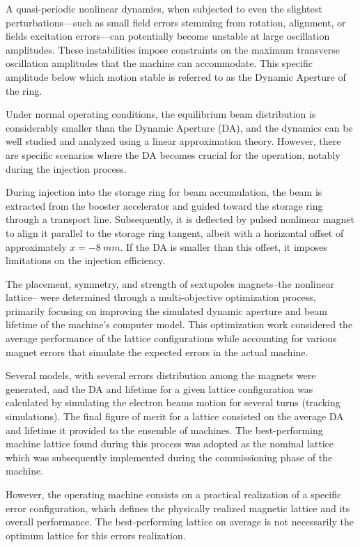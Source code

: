 A quasi-periodic nonlinear dynamics, when subjected to even the slightest perturbations—such as small field errors stemming from rotation, alignment, or fields excitation errors—can potentially become unstable at large oscillation amplitudes. These instabilities impose constraints on the maximum transverse oscillation amplitudes that the machine can accommodate. This specific amplitude below which motion stable is referred to as the Dynamic Aperture of the ring.

Under normal operating conditions, the equilibrium beam distribution is considerably smaller than the Dynamic Aperture (DA), and the dynamics can be well studied and analyzed using a linear approximation theory. However, there are specific scenarios where the DA becomes crucial for the operation, notably during the injection process.

During injection into the storage ring for beam accumulation, the beam is extracted from the booster accelerator and guided toward the storage ring through a transport line. Subsequently, it is deflected by pulsed nonlinear magnet to align it parallel to the storage ring tangent, albeit with a horizontal offset of approximately $x=-8~\unit{mm}$. If the DA is smaller than this offset, it imposes limitations on the injection efficiency.

The placement, symmetry, and strength of sextupoles magnets--the nonlinear lattice-- were determined through a multi-objective optimization process, primarily focusing on improving the simulated dynamic aperture and beam lifetime of the machine's computer model. This optimization work considered the average performance of the lattice configurations while accounting for various magnet errors that simulate the expected errors in the actual machine.

Several models, with several errors distribution among the magnets were generated, and the DA and lifetime for a given lattice configuration was calculated by simulating the electron beams motion for several turns (tracking simulations). The final figure of merit for a lattice consisted on the average DA and lifetime it provided to the ensemble of machines. The best-performing machine lattice found during this process was adopted as the nominal lattice which was subsequently implemented during the commissioning phase of the machine.

However, the operating machine consists on a practical realization of a specific error configuration, which defines the physically realized magnetic lattice and its overall performance. The best-performing lattice on average is not necessarily the optimum lattice for this errors realization.

